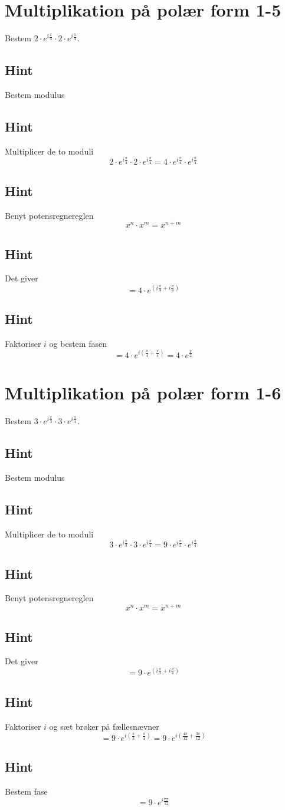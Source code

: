 \documentclass{article}
\newenvironment{exercise}[1]{\newpage\section{#1}}{}
\newcommand{\answerbox}[1]{\fbox{$#1$}}
\newcommand{\hint}{\subsection*{Hint}}
\begin{document}
\newpage

\begin{exercise}{Multiplikation på polær form 1-5}
	
	Bestem $2 \cdot e^{i \frac{\pi}{4}} \cdot 2 \cdot e^{i \frac{\pi}{4}}$.
	
	\answerbox{4 \cdot e^{\frac{\pi}{2}}}
	
	
	\hint 
	
	Bestem modulus
	
	
	\hint
	
	Multiplicer de to moduli 
	\[
	2 \cdot e^{i \frac{\pi}{4}} \cdot 2 \cdot e^{i \frac{\pi}{4}} = 4 \cdot e^{i \frac{\pi}{4}} \cdot e^{i \frac{\pi}{4}}
	\]
	
	\hint 
	
	Benyt potensregnereglen
	\[
	x^n \cdot x^m = x^{n+m}
	\]
	
	\hint
	
	Det giver
	\[
	=4 \cdot e^{(i \frac{\pi}{4} + i \frac{\pi}{4})}
	\]
	
	\hint
	
	Faktoriser $i$ og bestem fasen
	\[
	= 4 \cdot e^{i( \frac{\pi}{4} +\frac{\pi}{4})} = 4 \cdot e^{\frac{\pi}{2}}
	\]
	
	
\end{exercise}


\newpage

\begin{exercise}{Multiplikation på polær form 1-6}
	
	Bestem $3 \cdot e^{i \frac{\pi}{3}} \cdot 3 \cdot e^{i \frac{\pi}{4}}$.
	
	\answerbox{9 \cdot e^{i\frac{7 \pi}{12}}}
	
	
	\hint 
	
	Bestem modulus
	
	
	\hint
	
	Multiplicer de to moduli 
	\[
	3 \cdot e^{i \frac{\pi}{3}} \cdot 3 \cdot e^{i \frac{\pi}{4}} = 9 \cdot e^{i \frac{\pi}{3}}  \cdot e^{i \frac{\pi}{4}}
	\]
	
	\hint 
	
	Benyt potensregnereglen
	\[
	x^n \cdot x^m = x^{n+m}
	\]
	
	\hint
	
	Det giver
	\[
	=9 \cdot e^{(i \frac{\pi}{3}+i \frac{\pi}{4})}
	\]
	
	\hint
	
	Faktoriser $i$ og sæt brøker på fællesnævner
	\[
	= 9 \cdot e^{i( \frac{\pi}{3}+ \frac{\pi}{4})} = 9 \cdot e^{i( \frac{4 \pi}{12} + \frac{3\pi}{12})} 
	\]
	
	\hint
	
	Bestem fase
	\[
	= 9 \cdot e^{i\frac{7 \pi}{12}}
	\]
	
	
\end{exercise}
\end{document}
